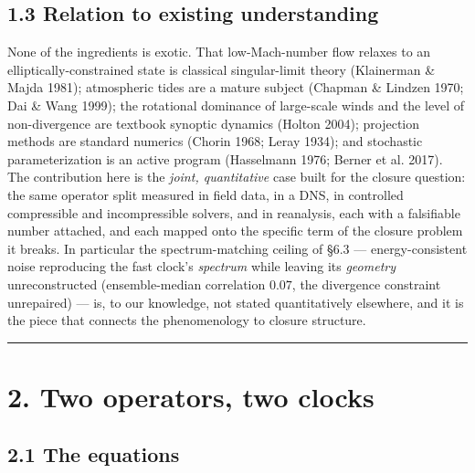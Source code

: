 \documentclass[aps,prfluids,preprint,superscriptaddress,nofootinbib]{revtex4-2}
\begin{document}
\subsection*{1.3 Relation to existing understanding}

None of the ingredients is exotic. That low-Mach-number flow relaxes to an elliptically-constrained state is classical singular-limit theory (Klainerman \& Majda 1981); atmospheric tides are a mature subject (Chapman \& Lindzen 1970; Dai \& Wang 1999); the rotational dominance of large-scale winds and the level of non-divergence are textbook synoptic dynamics (Holton 2004); projection methods are standard numerics (Chorin 1968; Leray 1934); and stochastic parameterization is an active program (Hasselmann 1976; Berner et al. 2017). The contribution here is the \emph{joint, quantitative} case built for the closure question: the same operator split measured in field data, in a DNS, in controlled compressible and incompressible solvers, and in reanalysis, each with a falsifiable number attached, and each mapped onto the specific term of the closure problem it breaks. In particular the spectrum-matching ceiling of \S6.3 --- energy-consistent noise reproducing the fast clock's \emph{spectrum} while leaving its \emph{geometry} unreconstructed (ensemble-median correlation $0.07$, the divergence constraint unrepaired) --- is, to our knowledge, not stated quantitatively elsewhere, and it is the piece that connects the phenomenology to closure structure.

\medskip\hrule\medskip

\section*{2. Two operators, two clocks}

\subsection*{2.1 The equations}
\end{document}

